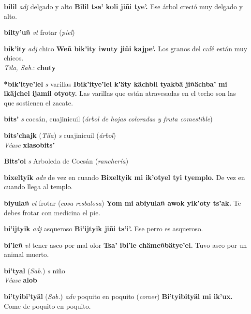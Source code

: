 \documentclass[10pt]{scrbook}
\newcommand{\entry}[1]{\textbf{#1}}
\newcommand{\partofspeech}[1]{\textit{#1}}
\newcommand{\spanishtranslation}[1]{#1}
\newcommand{\clarification}[1]{(\textit{#1})}
\newcommand{\cholexample}[1]{\textbf{#1}}
\newcommand{\exampletranslation}[1]{#1}
\newcommand{\dialectvariant}[1]{\\\textit{#1}:}
\newcommand{\dialectword}[1]{\textbf{#1}}
\newcommand{\alsosee}[1]{\\\textit{Véase} \textbf{#1}}
\newcommand{\relevantdialect}[1]{(\textit{#1})}
\begin{document}
\begin{multicols}{2}
\entry{bilil}
\partofspeech{adj}
\spanishtranslation{delgado y alto}
\cholexample{Bilil tsa' koli jiñi tye'.}
\exampletranslation{Ese árbol creció muy delgado y alto.}

\entry{bilty'uñ}
\partofspeech{vt}
\spanishtranslation{frotar}
\clarification{piel}

\entry{bik'ity}
\partofspeech{adj}
\spanishtranslation{chico}
\cholexample{Weñ bik'ity iwuty jiñi kajpe'.}
\exampletranslation{Los granos del café están muy chicos.}
\dialectvariant{Tila, Sab.}
\dialectword{chuty}

\entry{*bik'itye'lel}
\partofspeech{s}
\spanishtranslation{varillas}
\cholexample{Ibik'itye'lel k'äty kächbil tyakbä jiñächba' mi ikäjchel ijamil otyoty.}
\exampletranslation{Las varillas que están atravesadas en el techo son las que sostienen el zacate.}

\entry{bits'}
\partofspeech{s}
\spanishtranslation{cocsán, cuajinicuil}
\clarification{árbol de hojas coloradas y fruta comestible}

\entry{bits'chajk}
\relevantdialect{Tila}
\partofspeech{s}
\spanishtranslation{cuajinicuil}
\clarification{árbol}
\alsosee{xlasobits'}

\entry{Bits'ol}
\partofspeech{s}
\spanishtranslation{Arboleda de Cocsán}
\clarification{ranchería}

\entry{bixeltyik}
\partofspeech{adv}
\spanishtranslation{de vez en cuando}
\cholexample{Bixeltyik mi ik'otyel tyi tyemplo.}
\exampletranslation{De vez en cuando llega al templo.}

\entry{biyulañ}
\partofspeech{vt}
\spanishtranslation{frotar}
\clarification{cosa resbalosa}
\cholexample{Yom mi abiyulañ awok yik'oty ts'ak.}
\exampletranslation{Te debes frotar con medicina el pie.}

\entry{bi'ijtyik}
\partofspeech{adj}
\spanishtranslation{asqueroso}
\cholexample{Bi'ijtyik jiñi ts'i'.}
\exampletranslation{Ese perro es asqueroso.}

\entry{bi'leñ}
\partofspeech{vt}
\spanishtranslation{tener asco por mal olor}
\cholexample{Tsa' ibi'le chämeñbätye'el.}
\exampletranslation{Tuvo asco por un animal muerto.}

\entry{bi'tyal}
\relevantdialect{Sab.}
\partofspeech{s}
\spanishtranslation{niño}
\alsosee{alob}

\entry{bi'tyibi'tyäl}
\relevantdialect{Sab.}
\partofspeech{adv}
\spanishtranslation{poquito en poquito}
\clarification{comer}
\cholexample{Bi'tyibityäl mi ik'ux.}
\exampletranslation{Come de poquito en poquito.}


\end{multicols}
\end{document}
